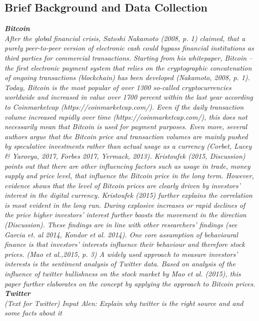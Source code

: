 \documentclass[a4paper,american,12pt]{article}
\begin{document}
\begin{spacing}{1.2}
		\section{Brief Background and Data Collection}
		\itshape\textbf {Bitcoin}\\
		\textnormal {After the global financial crisis, Satoshi Nakamoto (2008, p. 1) claimed, that a purely peer-to-peer version of electronic cash could bypass financial institutions as third parties for commercial transactions. Starting from his whitepaper, Bitcoin – the first electronic payment system that relies on the cryptographic concatenation of ongoing transactions (blockchain) has been developed (Nakamoto, 2008, p. 1).\newline
Today, Bitcoin is the most popular of over 1300 so-called cryptocurrencies worldwide and increased in value over 1700 percent within the last year according to Coinmarketcap (https://coinmarketcap.com/). Even if the daily transaction volume increased rapidly over time (https://coinmarketcap.com/), this does not necessarily mean that Bitcoin is used for payment purposes. Even more, several authors argue that the Bitcoin price and transaction volumes are mainly pushed by speculative investments rather than actual usage as a currency (Corbet, Lucey \& Yarovya, 2017, Forbes 2017, Yermack, 2013). Kristoufek (2015, Discussion) points out that there are other influencing factors such as usage in trade, money supply and price level, that influence the Bitcoin price in the long term. However, evidence shows that the level of Bitcoin prices are clearly driven by investors’ interest in the digital currency. Kristoufek (2015) further explains the correlation is most evident in the long run.  During explosive increases or rapid declines of the price higher investors’ interest further boosts the movement in the direction (Discussion). These findings are in line with other researchers’ findings (see Garcia et. al 2014, Kondor et al. 2014).\newline
One core assumption of behavioural finance is that investors’ interests influence their behaviour and therefore stock prices. (Mao et al.,2015, p. 3) A widely used approach to measure investors’ interests is the sentiment analysis of Twitter data. Based on analysis of the influence of twitter bullishness on the stock market by Mao et al. (2015), this paper further elaborates on the concept by applying the approach to Bitcoin prices.
 }\\
		
		\itshape\textbf {Twitter}\\
		\textnormal {(Text for Twitter) Input Alen: Explain why twitter is the right source and and some facts about it}\\
		

\end{spacing}
\end{document}
